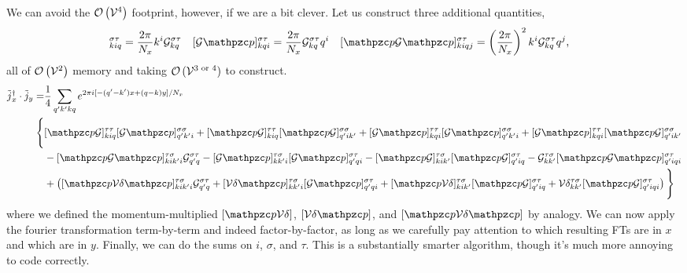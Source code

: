 We can avoid the $\mathcal{O}\left(\mathcal{V}^4\right)$ footprint, however, if we are a bit clever.
Let us construct three additional quantities,
\begin{align}
	[\p\G]^{\sigma\tau}_{kiq} &= \frac{2\pi}{N_x} k^i \G^{\sigma\tau}_{kq}
	&
	[\G \p]^{\sigma\tau}_{kqi} &= \frac{2\pi}{N_x} \G^{\sigma\tau}_{kq} q^i
	&
	[\p\G \p]^{\sigma\tau}_{kiqj} &= \left(\frac{2\pi}{N_x}\right)^2 k^i \G^{\sigma\tau}_{kq} q^j,
\end{align}
all of $\mathcal{O}\left(\mathcal{V}^2\right)$ memory and taking $\mathcal{O}\left(\mathcal{V}^{\text{3 or 4}}\right)$ to construct.
\begin{align}
	\tilde{j}\adjoint_x \cdot \tilde{j}_y
	=&
	\oneover{4}\sum_{q'k'kq} e^{2\pi i[ -(q'-k')x + (q-k) y]/N_x}
	\nonumber\\
	\Bigg\{&
		[\p\G]^{\tau\tau}_{kiq} [\G\p]^{\sigma\sigma}_{q'k'i}
	+	[\p\G]^{\tau\tau}_{kiq} [\p\G]^{\sigma\sigma}_{q'ik'}
	+	[\G\p]^{\tau\tau}_{kqi} [\G\p]^{\sigma\sigma}_{q'k'i}
	+	[\G\p]^{\tau\tau}_{kqi} [\p\G]^{\sigma\sigma}_{q'ik'}
	\nonumber\\
	&
	-	[\p\G\p]^{\tau\sigma}_{kik'i} \G^{\sigma\tau}_{q'q}
	-	[\G\p]^{\tau\sigma}_{kk'i} [\G\p]^{\sigma\tau}_{q'qi}
	-	[\p\G]^{\tau\sigma}_{kik'} [\p\G]^{\sigma\tau}_{q'iq}
	-	\G^{\tau\sigma}_{kk'} [\p\G\p]^{\sigma\tau}_{q'iqi}
	\nonumber\\
	&
	+\left(
		[\p\Volume\delta\p]^{\tau\sigma}_{kik'i} \G^{\sigma\tau}_{q'q}
	+	[\Volume\delta\p]^{\tau\sigma}_{kk'i} [\G\p]^{\sigma\tau}_{q'qi}
	+	[\p\Volume\delta]^{\tau\sigma}_{kik'} [\p\G]^{\sigma\tau}_{q'iq}
	+	\Volume\delta^{\tau\sigma}_{kk'} [\p\G]^{\sigma\tau}_{q'iqi}
	\right)
	\Bigg\}
\end{align}
where we defined the momentum-multiplied $[\p\Volume\delta]$, $[\Volume\delta\p]$, and $[\p\Volume\delta\p]$ by analogy.
We can now apply the fourier transformation term-by-term and indeed factor-by-factor, as long as we carefully pay attention to which resulting FTs are in $x$ and which are in $y$.
Finally, we can do the sums on $i$, $\sigma$, and $\tau$.
This is a substantially smarter algorithm, though it's much more annoying to code correctly.
